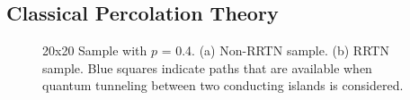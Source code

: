 \documentclass[11pt,a4paper]{report}
\begin{document}
\subsection{Classical Percolation Theory}\label{section:Classical Percolation Theory}
\begin{figure}[!b]
\begin{minipage}{.5\linewidth}
\centering
{}
\end{minipage}
\begin{minipage}{.5\linewidth}
\centering
{}

\end{minipage}\par\medskip
\caption{20x20 Sample with $p$ = 0.4. (a) Non-RRTN sample. (b) RRTN sample. Blue squares indicate paths that are available when quantum tunneling between two conducting islands is considered.}\label{fig:Simulation Sample figure}
\end{figure}
\end{document}
